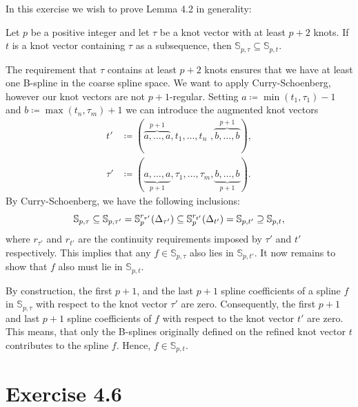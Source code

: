 \documentclass{article}
\renewcommand{\S}{\mathbb{S}}
\begin{document}
    In this exercise we wish to prove Lemma 4.2 in generality:
    \begin{lemma}[4.2]
        Let $p$ be a positive integer and let $\tau$ be a knot vector with at
        least $p+2$ knots. If $t$ is a knot vector containing $\tau$ as a
        subsequence, then $\S_{p, \tau} \subseteq \S_{p, t}$.
    \end{lemma}
    The requirement that $\tau$ contains at least $p + 2$ knots ensures that we
    have at least one B-spline in the coarse spline space.  We want to apply
    Curry-Schoenberg, however our knot vectors are not $p+1$-regular. Setting
    $a \coloneqq \min(t_1, \tau_1) - 1$ and $b \coloneqq \max(t_n, \tau_m) + 1$
    we can introduce the augmented knot vectors
    \begin{align*}
        t' &\coloneqq (\overbrace{a, \ldots, a}^{p+1}, t_1, \ldots, t_n\,\,,
        \overbrace{b, \ldots, b}^{p+1}), \\ \tau' &\coloneqq (\underbrace{a,
    \ldots, a}_{p+1}, \tau_1, \ldots, \tau_m, \underbrace{b, \ldots, b}_{p+1}).
    \end{align*}
    By Curry-Schoenberg, we have the following inclusions:
    \begin{equation}
        \notag
        \S_{p, \tau} \subseteq \S_{p, \tau'} = \S_p^{r_{\tau'}}(\Delta_{\tau'}) \subseteq
        \S_p^{r_{t'}}(\Delta_{t'}) = \S_{p, t'} \supseteq \S_{p, t}, 
    \end{equation}
    where $r_{\tau'}$ and $r_{t'}$ are the continuity requirements imposed by
    $\tau'$ and $t'$ respectively.  This implies that any $f \in \S_{p, \tau}$
    also lies in $\S_{p, t'}$. It now remains to show that $f$ also must lie in
    $\S_{p, t}$.

    By construction, the first $p+1$, and the last $p+1$ spline coefficients of
    a spline $f$ in $\S_{p, \tau}$ with respect to the knot vector $\tau'$ are
    zero. Consequently, the first $p+1$ and last $p+1$ spline coefficients of
    $f$ with respect to the knot vector $t'$ are zero. This means, that only
    the B-splines originally defined on the refined knot vector $t$ contributes
    to the spline $f$. Hence, $f \in \S_{p, t}$.
    
    \section*{Exercise 4.6}
    
\end{document}
